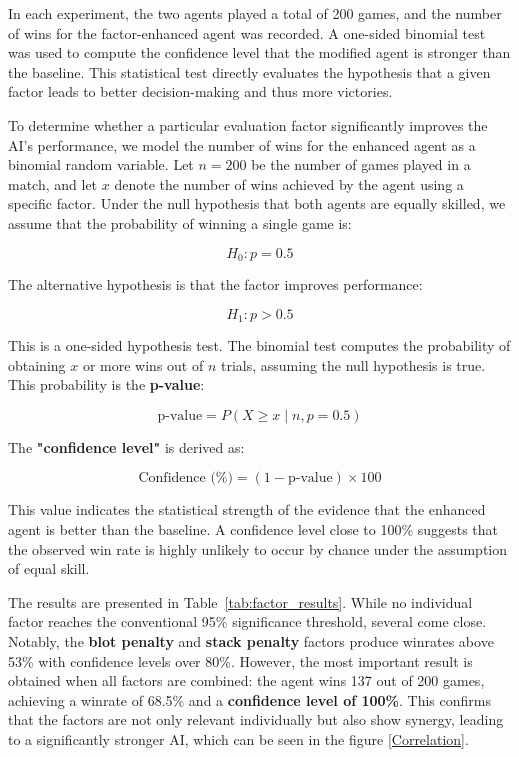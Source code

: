 In each experiment, the two agents played a total of 200 games, and the number of wins for the factor-enhanced agent was recorded. A one-sided binomial test was used to compute the confidence level that the modified agent is stronger than the baseline. This statistical test directly evaluates the hypothesis that a given factor leads to better decision-making and thus more victories.



To determine whether a particular evaluation factor significantly improves the AI's performance, we model the number of wins for the enhanced agent as a binomial random variable. Let \( n = 200 \) be the number of games played in a match, and let \( x \) denote the number of wins achieved by the agent using a specific factor. Under the null hypothesis that both agents are equally skilled, we assume that the probability of winning a single game is:

\[
H_0: p = 0.5
\]

The alternative hypothesis is that the factor improves performance:

\[
H_1: p > 0.5
\]

This is a one-sided hypothesis test. The binomial test computes the probability of obtaining \( x \) or more wins out of \( n \) trials, assuming the null hypothesis is true. This probability is the \textbf{p-value}:

\[
\text{p-value} = P(X \geq x \mid n, p = 0.5)
\]

The \textbf{"confidence level"} is derived as:

\[
\text{Confidence (\%)} = (1 - \text{p-value}) \times 100
\]

This value indicates the statistical strength of the evidence that the enhanced agent is better than the baseline. A confidence level close to 100\% suggests that the observed win rate is highly unlikely to occur by chance under the assumption of equal skill.

The results are presented in Table~\ref{tab:factor_results}. While no individual factor reaches the conventional 95\% significance threshold, several come close. Notably, the \textbf{blot penalty} and \textbf{stack penalty} factors produce winrates above 53\% with confidence levels over 80\%. However, the most important result is obtained when all factors are combined: the agent wins 137 out of 200 games, achieving a winrate of 68.5\% and a \textbf{confidence level of 100\%}. This confirms that the factors are not only relevant individually but also show synergy, leading to a significantly stronger AI, which can be seen in the figure \ref{Correlation}.

